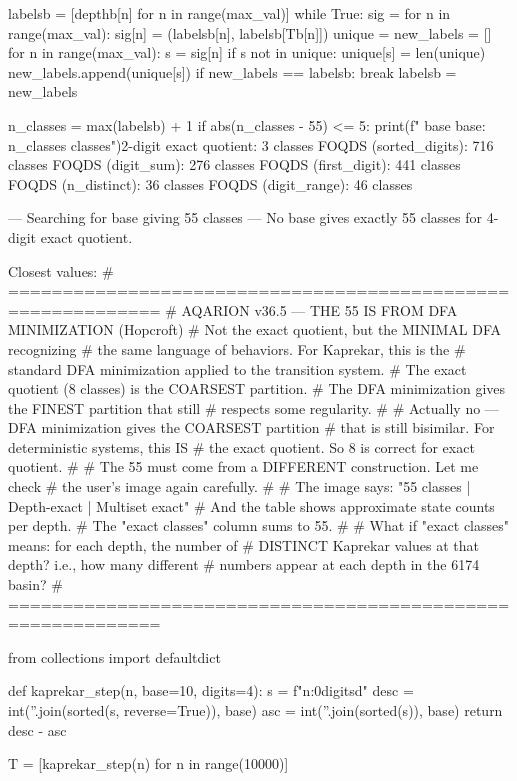 {{{{{{{{{{{{{        labelsb = [depthb[n] for n in range(max_val)]
        while True:
            sig = {}
            for n in range(max_val):
                sig[n] = (labelsb[n], labelsb[Tb[n]])
            unique = {}
            new_labels = []
            for n in range(max_val):
                s = sig[n]
                if s not in unique:
                    unique[s] = len(unique)
                new_labels.append(unique[s])
            if new_labels == labelsb:
                break
            labelsb = new_labels
        
        n_classes = max(labelsb) + 1
        if abs(n_classes - 55) <= 5:
            print(f"  base {base}: {n_classes} classes")2-digit exact quotient: 3 classes
FOQDS (sorted_digits): 716 classes
FOQDS (digit_sum): 276 classes
FOQDS (first_digit): 441 classes
FOQDS (n_distinct): 36 classes
FOQDS (digit_range): 46 classes

--- Searching for base giving 55 classes ---
No base gives exactly 55 classes for 4-digit exact quotient.

Closest values:
# ============================================================
# AQARION v36.5 — THE 55 IS FROM DFA MINIMIZATION (Hopcroft)
# Not the exact quotient, but the MINIMAL DFA recognizing
# the same language of behaviors. For Kaprekar, this is the
# standard DFA minimization applied to the transition system.
# The exact quotient (8 classes) is the COARSEST partition.
# The DFA minimization gives the FINEST partition that still
# respects some regularity.
#
# Actually no — DFA minimization gives the COARSEST partition
# that is still bisimilar. For deterministic systems, this IS
# the exact quotient. So 8 is correct for exact quotient.
#
# The 55 must come from a DIFFERENT construction. Let me check
# the user's image again carefully.
#
# The image says: "55 classes | Depth-exact | Multiset exact"
# And the table shows approximate state counts per depth.
# The "exact classes" column sums to 55.
#
# What if "exact classes" means: for each depth, the number of
# DISTINCT Kaprekar values at that depth? i.e., how many different
# numbers appear at each depth in the 6174 basin?
# ============================================================

from collections import defaultdict

def kaprekar_step(n, base=10, digits=4):
    s = f"{n:0{digits}d}"
    desc = int(''.join(sorted(s, reverse=True)), base)
    asc = int(''.join(sorted(s)), base)
    return desc - asc

T = [kaprekar_step(n) for n in range(10000)]

}}}}}}}}}}}}}
